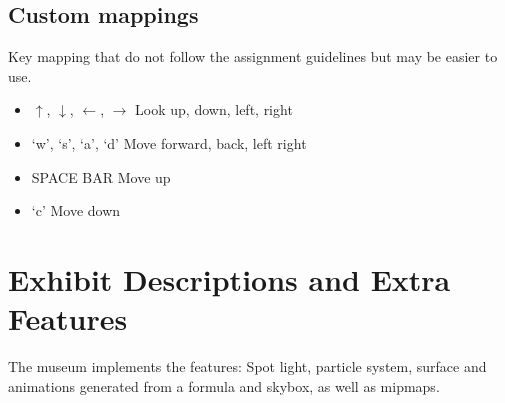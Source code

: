 \documentclass[10pt, oneside]{article}   	%
\begin{document}
\subsection{Custom mappings}
Key mapping that do not follow the assignment guidelines but may be easier to use.
\begin{itemize}   %
\item $\uparrow$, $\downarrow$, $\leftarrow$, $\rightarrow$ Look up, down, left, right
\item `w', `s', `a', `d' Move forward, back, left right
\item SPACE BAR Move up
\item `c' Move down
\end{itemize}


\section{Exhibit Descriptions and Extra Features}
The museum implements the features: Spot light, particle system, surface and animations generated from a formula and skybox, as well as mipmaps.
\end{document}
